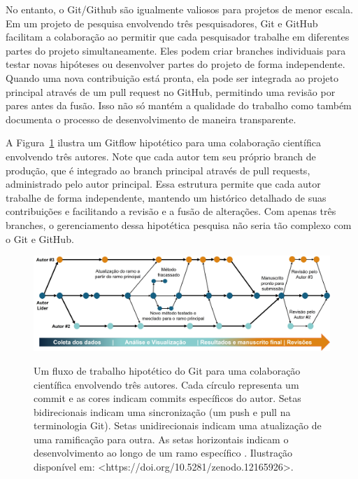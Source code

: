 \documentclass[
  a4paper,
]{book}
\begin{document}
No entanto, o Git/Github são igualmente valiosos para projetos de menor
escala. Em um projeto de pesquisa envolvendo três pesquisadores, Git e
GitHub facilitam a colaboração ao permitir que cada pesquisador trabalhe
em diferentes partes do projeto simultaneamente. Eles podem criar
branches individuais para testar novas hipóteses ou desenvolver partes
do projeto de forma independente. Quando uma nova contribuição está
pronta, ela pode ser integrada ao projeto principal através de um pull
request no GitHub, permitindo uma revisão por pares antes da fusão. Isso
não só mantém a qualidade do trabalho como também documenta o processo
de desenvolvimento de maneira transparente.

A Figura~\ref{fig-git3autores} ilustra um Gitflow hipotético para uma
colaboração científica envolvendo três autores. Note que cada autor tem
seu próprio branch de produção, que é integrado ao branch principal
através de pull requests, administrado pelo autor principal. Essa
estrutura permite que cada autor trabalhe de forma independente,
mantendo um histórico detalhado de suas contribuições e facilitando a
revisão e a fusão de alterações. Com apenas três branches, o
gerenciamento dessa hipotética pesquisa não seria tão complexo com o Git
e GitHub.

\begin{figure}

\href{https://doi.org/10.5281/zenodo.12165926}{\includegraphics{img/git3autores.jpg}}

\caption{\label{fig-git3autores}Um fluxo de trabalho hipotético do Git
para uma colaboração científica envolvendo três autores. Cada círculo
representa um commit e as cores indicam commits específicos do autor.
Setas bidirecionais indicam uma sincronização (um push e pull na
terminologia Git). Setas unidirecionais indicam uma atualização de uma
ramificação para outra. As setas horizontais indicam o desenvolvimento
ao longo de um ramo específico . Ilustração disponível em:
\textless https://doi.org/10.5281/zenodo.12165926\textgreater.}

\end{figure}%
\end{document}
